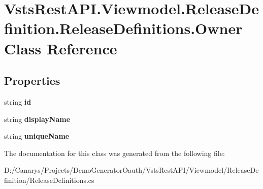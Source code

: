 \hypertarget{class_vsts_rest_a_p_i_1_1_viewmodel_1_1_release_definition_1_1_release_definitions_1_1_owner}{}\section{Vsts\+Rest\+A\+P\+I.\+Viewmodel.\+Release\+Definition.\+Release\+Definitions.\+Owner Class Reference}
\label{class_vsts_rest_a_p_i_1_1_viewmodel_1_1_release_definition_1_1_release_definitions_1_1_owner}
\subsection*{Properties}
\begin{DoxyCompactItemize}
\item 
\mbox{\label{class_vsts_rest_a_p_i_1_1_viewmodel_1_1_release_definition_1_1_release_definitions_1_1_owner_adb87c8564f7e28c615567a06cb2a6773}} 
string {\bfseries id}
\item 
\mbox{\label{class_vsts_rest_a_p_i_1_1_viewmodel_1_1_release_definition_1_1_release_definitions_1_1_owner_aff4ad58c3569fb320272671f8272a95c}} 
string {\bfseries display\+Name}
\item 
\mbox{\label{class_vsts_rest_a_p_i_1_1_viewmodel_1_1_release_definition_1_1_release_definitions_1_1_owner_a26fdc92d085b67be4fc75a20f13d52b4}} 
string {\bfseries unique\+Name}
\end{DoxyCompactItemize}


The documentation for this class was generated from the following file\+:\begin{DoxyCompactItemize}
\item 
D\+:/\+Canarys/\+Projects/\+Demo\+Generator\+Oauth/\+Vsts\+Rest\+A\+P\+I/\+Viewmodel/\+Release\+Definition/Release\+Definitions.\+cs\end{DoxyCompactItemize}

